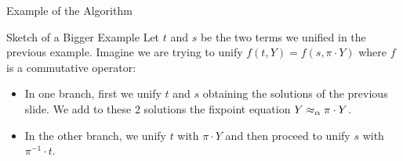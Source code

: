 \begin{frame}{Example of the Algorithm} 
\end{frame}

\begin{frame}{Sketch of a Bigger Example}
    Let $t$ and $s$ be the two terms we unified in the previous example. Imagine 
    we are trying to unify $f(t, Y) = f(s, \pi \cdot Y)$ where $f$ is a commutative
    operator: 
    \begin{itemize}
        \item In one branch, first we unify $t$ and $s$ obtaining the solutions of
            the previous slide. We add to these 2 solutions the fixpoint equation
            $Y \mathrel{\approx_\alpha} \pi \cdot Y$. 
        \item In the other branch, we unify $t$ with $\pi \cdot Y$ 
            and then proceed to unify $s$ with $\pi^{-1} \cdot t$.
    \end{itemize}
\end{frame}


